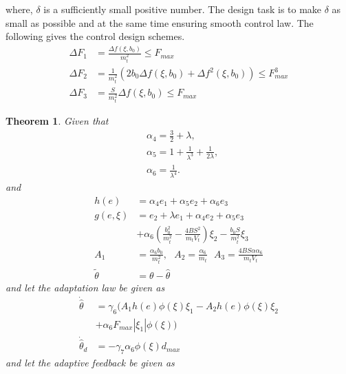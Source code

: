 \documentclass{article} %
\newtheorem{theorem}{Theorem}
\begin{document}
where, $\delta$ is a sufficiently small positive number. The design task is to make $\delta$ as small as possible and at the same time ensuring smooth control law. The following gives the control design schemes.
\begin{equation} \label{MyEq87}
  \begin{split}
  \Delta F_1 &=\tfrac{\Delta f(\xi,b_0)}{m_t^2} \leq F_{max}\\
  \Delta F_2  &= \tfrac{1}{m_t^2}(2b_0\Delta f(\xi,b_0)+\Delta f^2(\xi,b_0)) \leq F^3_{max}\\
  \Delta F_3  &= \tfrac{S}{m_t^2}\Delta f(\xi,b_0) \leq F_{max}
  \end{split}
\end{equation}
\begin{theorem}
Given that
\begin{align} \label{MyEq14}
& \alpha_4= \tfrac{3}{2}+\lambda ,\nonumber \\
& \alpha_5= 1 + \tfrac{1}{\lambda^3}+\tfrac{1}{2 \lambda},\\
& \alpha_6=\tfrac{1}{\lambda^4}\nonumber.
\end{align}
and
\begin{equation} \label{MyEq99}
  \begin{split}
   h(e) &= \alpha_4e_1+\alpha_5e_2+\alpha_6e_3\\
   g(e,\xi) &= e_2+\lambda e_1+\alpha_4e_2+\alpha_5e_3\\
   &+\alpha_6(\tfrac{b_0^2}{m_t^2}-\tfrac{4BS^2}{m_tV_t})\xi_2-\tfrac{b_0S}{m_t^2}\xi_3\\
   A_1 & =\tfrac{\alpha_6b_0}{m_t^2}, \ \ \ A_2=\tfrac{\alpha_6}{m_t} \ \ \  A_3=\tfrac{4BS\alpha\alpha_6}{m_tV_t}\\
   \tilde{\theta} & = \theta -\hat \theta
  \end{split}
\end{equation}
and let the adaptation law be given as
\begin{equation}
  \begin{split}\label{MyEq99aaa}
  {\dot {\hat \theta}} &=\gamma_6(A_1h(e)\phi(\xi)\xi_1-A_2h(e)\phi(\xi)\xi_2\\
                       &+\alpha_6F_{max}|\xi_1|\phi(\xi))\\
  {\dot {\hat \theta}_d} &=-\gamma_7\alpha_6\phi(\xi)d_{max}
  \end{split}
\end{equation}
and let the adaptive feedback be given as
\begin{equation}\label{MyEq2ccc}
  \begin{split}

\end{split}
\end{equation}
\end{theorem}
\end{document}
